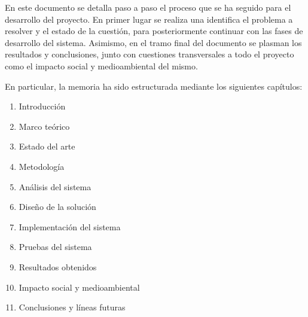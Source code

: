     En este documento se detalla paso a paso el proceso que se ha seguido para el desarrollo del proyecto. En primer lugar se realiza una identifica el problema a resolver y el estado de la cuestión, para posteriormente continuar con las fases de desarrollo del sistema. Asimismo, en el tramo final del documento se plasman los resultados y conclusiones, junto con cuestiones transversales a todo el proyecto como el impacto social y medioambiental del mismo.
    
    
    En particular, la memoria ha sido estructurada mediante los siguientes capítulos:
    \begin{enumerate}
        \item Introducción
        \item Marco teórico
        \item Estado del arte
        \item Metodología 
        \item Análisis del sistema
        \item Diseño de la solución
        \item Implementación del sistema
        \item Pruebas del sistema
        \item Resultados obtenidos
        \item Impacto social y medioambiental
        \item Conclusiones y líneas futuras
    \end{enumerate}